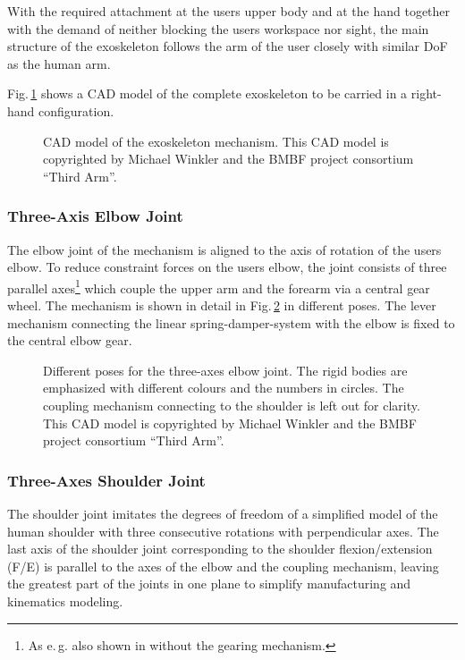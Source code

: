 \documentclass[twocolumn,10pt]{IFTOMM}
\begin{document}
With the required attachment at the users upper body and at the hand together with the demand of neither blocking the users workspace nor sight, the main structure of the exoskeleton follows the arm of the user closely with similar DoF as the human arm.

Fig.\,\ref{fig:KAS5_CAD} shows a CAD model of the complete exoskeleton to be carried in a right-hand configuration.


\begin{figure}[tb!]
    
    \caption{CAD model of the exoskeleton mechanism. This CAD model is copyrighted by Michael Winkler and the BMBF project consortium ``Third Arm''.}
    \label{fig:KAS5_CAD}
\end{figure} 

\subsubsection{Three-Axis Elbow Joint}

The elbow joint of the mechanism is aligned to the axis of rotation of the users elbow.
To reduce constraint forces on the users elbow, the joint consists of three parallel axes\footnote{As e.\,g. also shown in \cite{Pons2008} without the gearing mechanism.} which couple the upper arm and the forearm via a central gear wheel. The mechanism is shown in detail in Fig.\,\ref{fig:EllenbogenSimMech} in different poses.
The lever mechanism connecting the linear spring-damper-system with the elbow is fixed to the central elbow gear.

\begin{figure}[tb!]
    \small
    
    \caption{Different poses for the three-axes elbow joint. The rigid bodies are emphasized with different colours and the numbers in circles. The coupling mechanism connecting to the shoulder is left out for clarity. This CAD model is copyrighted by Michael Winkler and the BMBF project consortium ``Third Arm''.}
    \label{fig:EllenbogenSimMech}
\end{figure} 

\subsubsection{Three-Axes Shoulder Joint}

The shoulder joint imitates the degrees of freedom of a simplified model of the human shoulder with three consecutive rotations with perpendicular axes.
The last axis of the shoulder joint corresponding to the shoulder flexion/extension (F/E) is parallel to the axes of the elbow and the coupling mechanism, leaving the greatest part of the joints in one plane to simplify manufacturing and kinematics modeling.
\end{document}
